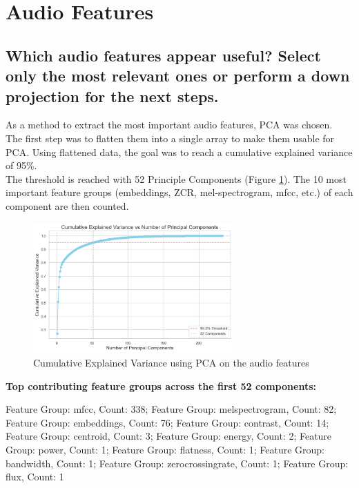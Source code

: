 
\section{Audio Features}
\label{sec:Audio Features}

\subsection{Which audio features appear useful? Select only the most relevant ones or perform a down projection for the next steps.}
\label{sec:Audio Features:a}

As a method to extract the most important audio features, PCA was chosen.\\
The first step was to flatten them into a single array to make them usable for PCA. Using flattened data, the goal was to reach a cumulative explained variance of 95\%.\\
The threshold is reached with 52 Principle Components (Figure \ref{fig:Cumulative Explained Variance}).  The 10 most important feature groups (embeddings, ZCR, mel-spectrogram, mfcc, etc.) of each component are then counted. 

\begin{figure}[htbp]
    \centering
    \includegraphics[width=0.5\linewidth, height=5cm]{figs/Cumulative Explained Variance.png}
    \caption{Cumulative Explained Variance using PCA on the audio features}
    \label{fig:Cumulative Explained Variance}
\end{figure}

\textbf{Top contributing feature groups across the first 52 components:}

Feature Group: mfcc, Count: 338;
Feature Group: melspectrogram, Count: 82;
Feature Group: embeddings, Count: 76;
Feature Group: contrast, Count: 14;
Feature Group: centroid, Count: 3;
Feature Group: energy, Count: 2;
Feature Group: power, Count: 1;
Feature Group: flatness, Count: 1;
Feature Group: bandwidth, Count: 1;
Feature Group: zerocrossingrate, Count: 1;
Feature Group: flux, Count: 1

